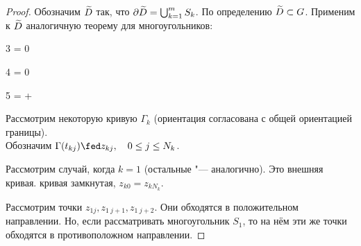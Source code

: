 \begin{proof}
	Обозначим $ \widetilde D $ так, что $ \partial \widetilde D = \bigcup_{k = 1}^m S_k $. По определению $ \widetilde D \subset G $. Применим к $ \widetilde D $ аналогичную теорему для многоугольников:
	\begin{equ}3
		 = 0
	\end{equ}
	\begin{equ}4
		\implies \cint[z]{\curvedir[0]\partial\vawe D}{f(z)} = 0
	\end{equ}
	\begin{equ}5
		\implies {} =  + 
	\end{equ}
	Рассмотрим некоторую кривую $ \Gamma_k $ (ориентация согласована с общей ориентацией границы). \\
	Обозначим $ \Gamma(t_{kj}) \fed z_{kj}, \quad 0 \le j \le N_k $.

	Рассмотрим случай, когда $ k = 1 $ (остальные "--- аналогично). Это внешняя кривая. \As кривая замкнутая, $ z_{k0} = z_{kN_k} $.

	Рассмотрим точки $ z_{1j}, z_{1~j + 1}, z_{1~j + 2} $. Они обходятся в положительном направлении. Но, если рассматривать многоугольник $ S_1 $, то на нём эти же точки обходятся в противоположном направлении.


\end{proof}
